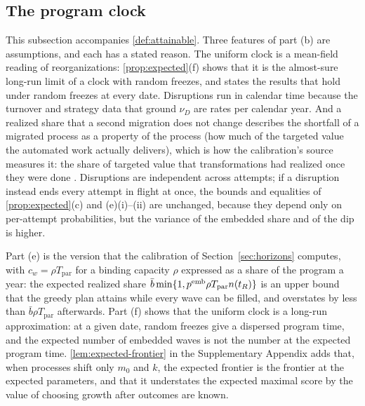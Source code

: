 \subsection{The program clock}\label{supp:model-clock}
This subsection accompanies \autoref{def:attainable}. Three features of part (b) are assumptions, and each has a stated reason. The uniform clock is a mean-field reading of reorganizations: \autoref{prop:expected}(f) shows that it is the almost-sure long-run limit of a clock with random freezes, and states the results that hold under random freezes at every date. Disruptions run in calendar time because the turnover and strategy data that ground $\nu_D$ are rates per calendar year. And a realized share that a second migration does not change describes the shortfall of a migrated process as a property of the process (how much of the targeted value the automated work actually delivers), which is how the calibration's source measures it: the share of targeted value that transformations had realized once they were done \citep{mckinsey2021losing}. Disruptions are independent across attempts; if a disruption instead ends every attempt in flight at once, the bounds and equalities of \autoref{prop:expected}(c) and (e)(i)--(ii) are unchanged, because they depend only on per-attempt probabilities, but the variance of the embedded share and of the dip is higher.

Part (e) is the version that the calibration of Section~\ref{sec:horizons} computes, with $c_w=\rho T_{\mathrm{par}}$ for a binding capacity $\rho$ expressed as a share of the program a year: the expected realized share $\bar b\min\{1,p^{\rm emb}\rho T_{\mathrm{par}}n(t_R)\}$ is an upper bound that the greedy plan attains while every wave can be filled, and overstates by less than $\bar b\rho T_{\mathrm{par}}$ afterwards. Part (f) shows that the uniform clock is a long-run approximation: at a given date, random freezes give a dispersed program time, and the expected number of embedded waves is not the number at the expected program time. \autoref{lem:expected-frontier} in the Supplementary Appendix adds that, when processes shift only $m_0$ and $k$, the expected frontier is the frontier at the expected parameters, and that it understates the expected maximal score by the value of choosing growth after outcomes are known.

